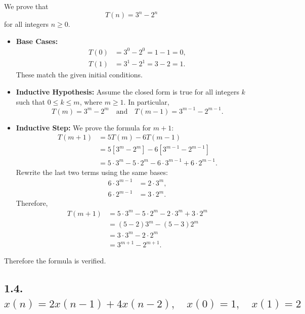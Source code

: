 \documentclass[12pt,a4paper]{article}
\begin{document}
We prove that
\begin{equation*}
T(n)=3^n-2^n
\end{equation*}
for all integers $n\ge 0$.
\begin{itemize}
    \item \textbf{Base Cases:}
    \begin{align*}
    T(0)&=3^0-2^0=1-1=0, \\
    T(1)&=3^1-2^1=3-2=1.
    \end{align*}
    These match the given initial conditions.

    \item \textbf{Inductive Hypothesis:} Assume the closed form is true for all integers $k$ such that $0\le k\le m$, where $m\ge 1$. In particular,
    \begin{equation*}
    T(m)=3^m-2^m
    \quad \text{and} \quad
    T(m-1)=3^{m-1}-2^{m-1}.
    \end{equation*}

    \item \textbf{Inductive Step:} We prove the formula for $m+1$:
    \begin{align*}
    T(m+1) &= 5T(m)-6T(m-1) \\
    &= 5[3^m-2^m]-6[3^{m-1}-2^{m-1}] \\
    &= 5\cdot 3^m-5\cdot 2^m-6\cdot 3^{m-1}+6\cdot 2^{m-1}.
    \end{align*}
    Rewrite the last two terms using the same bases:
    \begin{align*}
    6\cdot 3^{m-1}&=2\cdot 3^m, \\
    6\cdot 2^{m-1}&=3\cdot 2^m.
    \end{align*}
    Therefore,
    \begin{align*}
    T(m+1)
    &=5\cdot 3^m-5\cdot 2^m-2\cdot 3^m+3\cdot 2^m \\
    &=(5-2)3^m-(5-3)2^m \\
    &=3\cdot 3^m-2\cdot 2^m \\
    &=3^{m+1}-2^{m+1}.
    \end{align*}
\end{itemize}
Therefore the formula is verified.

\subsection*{1.4. $x(n) = 2 x(n-1) + 4 x(n-2), \quad x(0) = 1, \quad x(1) = 2$}
\end{document}
